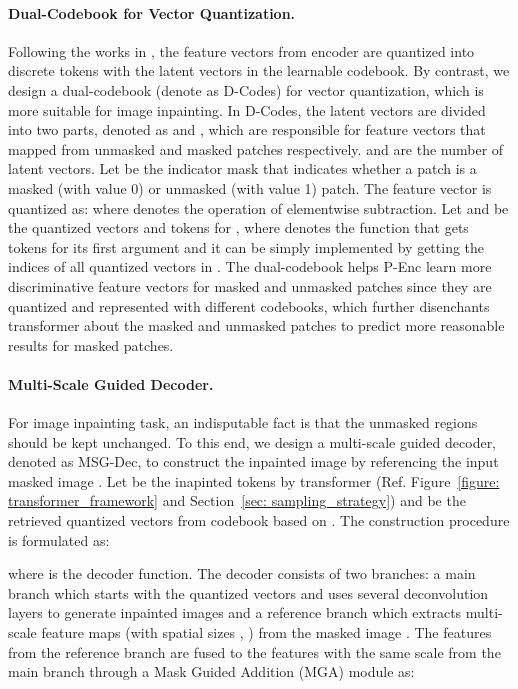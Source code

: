\documentclass[10pt,twocolumn,letterpaper]{article}
\newcommand{\Fref}[1]{Figure~\ref{#1}}
\newcommand{\Sref}[1]{Section~\ref{#1}}
\begin{document}
\paragraph{Dual-Codebook for Vector Quantization.}
\label{sec: d_codes}
Following the works in \cite{van2017neural, razavi2019generating, esser2021taming}, the feature vectors from encoder are quantized into discrete tokens with the latent vectors in the learnable codebook. By contrast, we design a dual-codebook (denote as D-Codes) for vector quantization, which is more suitable for image inpainting. In D-Codes, the latent vectors are divided into two parts, denoted as  and , which are responsible for feature vectors that mapped from unmasked and masked patches respectively.  and  are the number of latent vectors.
Let  be the indicator mask that indicates whether a patch is a masked (with value 0) or unmasked (with value 1) patch.
The feature vector  is quantized as:
where  denotes the operation of elementwise subtraction.  
Let  and  be the quantized vectors and tokens for , where  denotes the function that gets tokens for its first argument and it can be simply implemented by getting the indices of all quantized vectors in .
The dual-codebook helps P-Enc learn more discriminative feature vectors for masked and unmasked patches since they are quantized and represented with different codebooks, which further disenchants transformer about the masked and unmasked patches to predict more reasonable results for masked patches.

\paragraph{Multi-Scale Guided Decoder.}
\label{sec: msg_dec}
For image inpainting task, an indisputable fact is that the unmasked regions should be kept unchanged. To this end, we design a multi-scale guided decoder, denoted as MSG-Dec, to construct the inpainted image  by referencing the input masked image . 
Let  be the inapinted tokens by transformer (Ref. \Fref{figure: transformer_framework} and \Sref{sec: sampling_strategy}) and  be the retrieved quantized vectors from codebook based on . The construction procedure is formulated as:

where  is the decoder function. The decoder consists of two branches: a main branch which starts with the quantized vectors  and uses several deconvolution layers to generate inpainted images and a reference branch which extracts multi-scale feature maps (with spatial sizes , ) from the masked image . The features from the reference branch are fused to the features with the same scale from the main branch through a Mask Guided Addition (MGA) module as:
\end{document}
